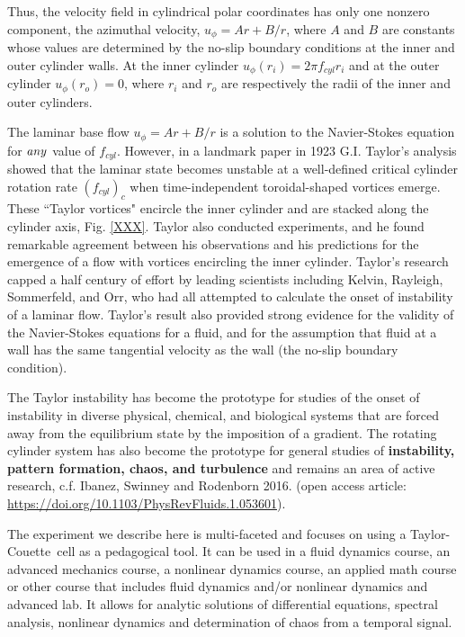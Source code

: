 \documentclass[%
reprint,
 amsmath,amssymb,
 aps,
prb,
floatfix,
longbibliography,
notitlepage
]{revtex4-1}
\newcommand{\DB}[1]{{\color{red}#1}} %
\newcommand{\TC}{Taylor-Couette}
\newcommand{\vel}{\ensuremath{u}} %
\newcommand{\rad}[1]{\ensuremath{r_{#1}}} %
\begin{document}
 Thus, the velocity field in cylindrical polar coordinates has only one nonzero component, the azimuthal velocity, $\vel_\phi = Ar + B/r$, where $A$ and $B$ are constants whose values are determined by the no-slip boundary conditions at the inner and outer cylinder walls. At the inner cylinder $\vel_\phi(\rad{i})= 2\pi f_{cyl}\rad{i}$  and at the outer cylinder $\vel_{\phi}(\rad{o}) = 0$, where $\rad{i}$ and $\rad{o}$ are respectively the radii of the inner and outer cylinders.

The laminar base flow $\vel_\phi = Ar + B/r$ is a solution to the Navier-Stokes equation for $\it any$ value of $f_{cyl}$. However, in a landmark paper in 1923 G.I. Taylor's analysis showed that the laminar state becomes unstable at a well-defined critical cylinder rotation rate $(f_{cyl})_c$ when time-independent toroidal-shaped vortices emerge.\cite{Taylor} These ``Taylor vortices" encircle the inner cylinder and are stacked along the cylinder axis, Fig. \ref{XXX}.  Taylor also conducted experiments, and he found remarkable agreement between his observations and his predictions for the emergence of a flow with vortices encircling the inner cylinder.  Taylor's research capped a half century of effort by leading scientists including Kelvin, Rayleigh, Sommerfeld, and Orr, who had all attempted to calculate the onset of instability of a laminar flow.  Taylor's result also provided strong evidence for the validity of the Navier-Stokes equations for a fluid, and for the assumption that fluid at a wall has the same tangential velocity as the wall (the no-slip boundary condition).  

The Taylor instability has become the prototype for studies of the onset of instability in diverse physical, chemical, and biological systems that are forced away from the equilibrium state by the imposition of a gradient.  The rotating cylinder system has also become the prototype for general studies of {\bf instability, pattern formation, chaos, and turbulence} and remains an area of active research, c.f. Ibanez, Swinney and Rodenborn 2016. (open access article: \url{https://doi.org/10.1103/PhysRevFluids.1.053601}).  

The experiment we describe here is multi-faceted and focuses on using a \TC\ cell as a pedagogical tool. It can be used in a fluid dynamics course, an advanced mechanics course, a nonlinear dynamics course, an applied math course or other course that includes fluid dynamics and/or nonlinear dynamics \DB{and advanced lab}.  It allows for analytic solutions of differential equations, spectral analysis, nonlinear dynamics and determination of chaos from a temporal signal. 
\end{document}
